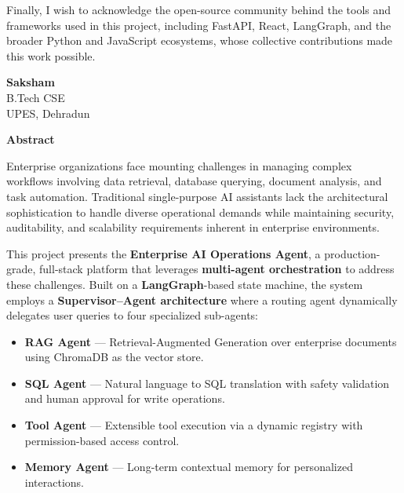 \documentclass[12pt, a4paper]{report}
\begin{document}
Finally, I wish to acknowledge the open-source community behind the tools and frameworks used in this project, including FastAPI, React, LangGraph, and the broader Python and JavaScript ecosystems, whose collective contributions made this work possible.

\vspace{2cm}

\begin{flushright}
\textbf{Saksham}\\
B.Tech CSE\\
UPES, Dehradun
\end{flushright}

\newpage
\thispagestyle{empty}
\begin{center}
{\LARGE \textbf{Abstract}}
\end{center}

\vspace{1cm}

Enterprise organizations face mounting challenges in managing complex workflows involving data retrieval, database querying, document analysis, and task automation. Traditional single-purpose AI assistants lack the architectural sophistication to handle diverse operational demands while maintaining security, auditability, and scalability requirements inherent in enterprise environments.

This project presents the \textbf{Enterprise AI Operations Agent}, a production-grade, full-stack platform that leverages \textbf{multi-agent orchestration} to address these challenges. Built on a \textbf{LangGraph}-based state machine, the system employs a \textbf{Supervisor--Agent architecture} where a routing agent dynamically delegates user queries to four specialized sub-agents:

\begin{itemize}[nosep]
    \item \textbf{RAG Agent} — Retrieval-Augmented Generation over enterprise documents using ChromaDB as the vector store.
    \item \textbf{SQL Agent} — Natural language to SQL translation with safety validation and human approval for write operations.
    \item \textbf{Tool Agent} — Extensible tool execution via a dynamic registry with permission-based access control.
    \item \textbf{Memory Agent} — Long-term contextual memory for personalized interactions.
\end{itemize}
\end{document}
